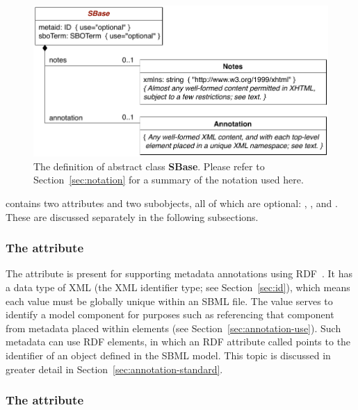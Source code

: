 \begin{figure}[hbt]
  \centering
  \small
  \includegraphics[scale=0.8]{figs/sbase-uml}
  \caption{The definition of abstract class \textup{\textbf{\textsf{SBase}}}.  Please refer
    to Section~\protect\ref{sec:notation} for a summary of the
    notation used here.}
  \label{fig:sbase}
\end{figure}

\SBase contains two attributes and two subobjects, all of which
are optional: , , \Notes and
\Annotation.  These are discussed separately in the following
subsections.


\subsubsection{The  attribute}
\label{sec:metaid}

The  attribute is present for supporting metadata
annotations using RDF~\citep[Resource Description
Format;][]{lassila:1999}.  It has a data type of XML 
(the XML identifier type; see Section~\ref{sec:id}), which means
each  value must be globally unique within an SBML
file.  The  value serves to identify a model
component for purposes such as referencing that component from
metadata placed within  elements (see
Section~\ref{sec:annotation-use}).  Such metadata can use RDF
 elements, in which an RDF attribute called
 points to the  identifier of an
object defined in the SBML model.  This topic is discussed in
greater detail in Section~\ref{sec:annotation-standard}.


\subsubsection{The  attribute}
\label{sec:sbase-sboterm}

